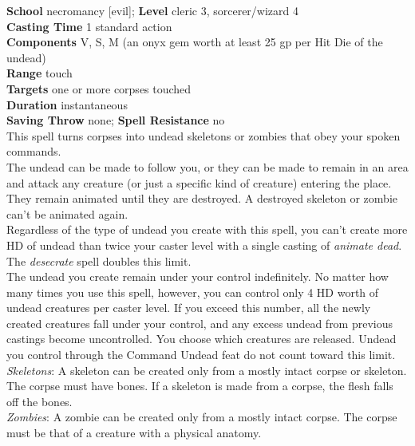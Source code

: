 \textbf{School} necromancy [evil]; \textbf{Level} cleric 3, sorcerer/wizard 4\\
\textbf{Casting Time} 1 standard action\\
\textbf{Components} V, S, M (an onyx gem worth at least 25 gp per Hit Die of the undead)\\
\textbf{Range} touch\\
\textbf{Targets} one or more corpses touched\\
\textbf{Duration} instantaneous\\
\textbf{Saving Throw} none; \textbf{Spell Resistance} no\\
This spell turns corpses into undead skeletons or zombies that obey your spoken commands.\\
The undead can be made to follow you, or they can be made to remain in an area and attack any creature (or just a specific kind of creature) entering the place. They remain animated until they are destroyed. A destroyed skeleton or zombie can't be animated again.\\
Regardless of the type of undead you create with this spell, you can't create more HD of undead than twice your caster level with a single casting of \textit{animate dead}. The \textit{desecrate }spell doubles this limit.\\
The undead you create remain under your control indefinitely. No matter how many times you use this spell, however, you can control only 4 HD worth of undead creatures per caster level. If you exceed this number, all the newly created creatures fall under your control, and any excess undead from previous castings become uncontrolled. You choose which creatures are released. Undead you control through the Command Undead feat do not count toward this limit.\\
\textit{Skeletons}: A skeleton can be created only from a mostly intact corpse or skeleton. The corpse must have bones. If a skeleton is made from a corpse, the flesh falls off the bones. \\
\textit{Zombies}: A zombie can be created only from a mostly intact corpse. The corpse must be that of a creature with a physical anatomy.\\
